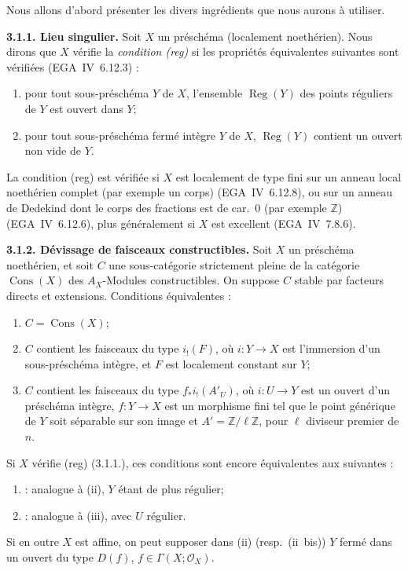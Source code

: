 \documentclass[11pt]{article}
\DeclareMathOperator{\Reg}{Reg}
\providecommand{\cO}{\mathcal{O}}
\providecommand{\Cons}{\operatorname{Cons}}
\newcommand{\Z}{\mathbb{Z}}
\providecommand{\Z}{\mathbb Z}
\begin{document}
Nous allons d'abord présenter les divers ingrédients que nous aurons à utiliser.

\textbf{3.1.1. Lieu singulier.} Soit $X$ un préschéma (localement noethérien). Nous dirons que $X$ vérifie la \emph{condition (reg)} si les propriétés équivalentes suivantes sont vérifiées (EGA~IV~6.12.3) :
\begin{enumerate}
\item[(i)] pour tout sous-préschéma $Y$ de $X$, l'ensemble $\Reg(Y)$ des points réguliers de $Y$ est ouvert dans $Y$;
\item[(ii)] pour tout sous-préschéma fermé intègre $Y$ de $X$, $\Reg(Y)$ contient un ouvert non vide de $Y$.
\end{enumerate}

La condition (reg) est vérifiée si $X$ est localement de type fini sur un anneau local noethérien complet (par exemple un corps) (EGA~IV~6.12.8), ou sur un anneau de Dedekind dont le corps des fractions est de car.~0 (par exemple $\Z$) (EGA~IV~6.12.6), plus généralement si $X$ est excellent (EGA~IV~7.8.6).

\textbf{3.1.2. Dévissage de faisceaux constructibles.} Soit $X$ un préschéma noethérien, et soit $C$ une sous-catégorie strictement pleine de la catégorie $\Cons(X)$ des $A_X$-Modules constructibles. On suppose $C$ stable par facteurs directs et extensions. Conditions équivalentes :
\begin{enumerate}
\item[(i)] $C = \Cons(X)$;
\item[(ii)] $C$ contient les faisceaux du type $i_{!}(F)$, où $i : Y \to X$ est l'immersion d'un sous-préschéma intègre, et $F$ est localement constant sur $Y$;
\item[(iii)] $C$ contient les faisceaux du type $f_{*}i_{!}(A'_U)$, où $i : U \to Y$ est un ouvert d'un préschéma intègre, $f : Y \to X$ est un morphisme fini tel que le point générique de $Y$ soit séparable sur son image et $A' = \Z/\ell\Z$, pour $\ell$ diviseur premier de $n$.
\end{enumerate}
Si $X$ vérifie (reg) (3.1.1.), ces conditions sont encore équivalentes aux suivantes :
\begin{enumerate}
\item[(ii~bis)] : analogue à (ii), $Y$ étant de plus régulier;
\item[(iii~bis)] : analogue à (iii), avec $U$ régulier.
\end{enumerate}
Si en outre $X$ est affine, on peut supposer dans (ii) (resp.~(ii~bis)) $Y$ fermé dans un ouvert du type $D(f)$, $f \in \Gamma(X; \cO_X)$.
\end{document}
